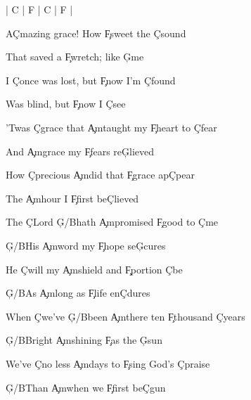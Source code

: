 \documentclass[9pt]{extarticle}
\begin{document}
\bsong

\bi
| C | F | C | F |
\ei

\bv
A\c{C}mazing grace! How \c{F}sweet the \c{C}sound

That saved a \c{F}wretch; like \c{G}me

I \c{C}once was lost, but \c{F}now I'm \c{C}found

Was blind, but \c{F}now I \c{C}see
\ev

\bv
’Twas \c{C}grace that \c{Am}taught my \c{F}heart to \c{C}fear

And \c{Am}grace my \c{F}fears re\c{G}lieved

How \c{C}precious \c{Am}did that \c{F}grace ap\c{C}pear

The \c{Am}hour I \c{F}first be\c{C}lieved
\ev

\bv
The \c{C}Lord \c{G/B}hath \c{Am}promised \c{F}good to \c{C}me

\c{G/B}His \c{Am}word my \c{F}hope se\c{G}cures

He \c{C}will my \c{Am}shield and \c{F}portion \c{C}be

\c{G/B}As \c{Am}long as \c{F}life en\c{C}dures
\ev

\bv
When \c{C}we’ve \c{G/B}been \c{Am}there ten \c{F}thousand \c{C}years

\c{G/B}Bright \c{Am}shining \c{F}as the \c{G}sun

We’ve \c{C}no less \c{Am}days to \c{F}sing God’s \c{C}praise

\c{G/B}Than \c{Am}when we \c{F}first be\c{C}gun
\ev

\esong
\end{document}

